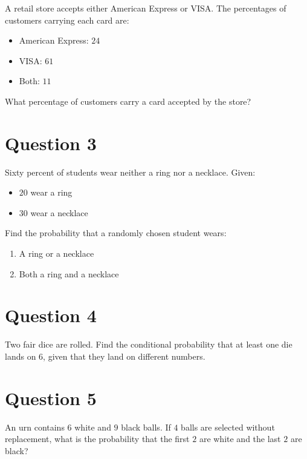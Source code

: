 \documentclass[
  letterpaper,
  DIV=11,
  numbers=noendperiod]{scrreprt}
\providecommand{\tightlist}{%
  \setlength{\itemsep}{0pt}\setlength{\parskip}{0pt}}\usepackage{longtable,booktabs,array}
\begin{document}
A retail store accepts either American Express or VISA. The percentages
of customers carrying each card are:

\begin{itemize}
\tightlist
\item
  American Express: \(24%
  \)
\item
  VISA: \(61%
  \)
\item
  Both: \(11%
  \)
\end{itemize}

What percentage of customers carry a card accepted by the store?

\section{Question 3}\label{question-3}

Sixty percent of students wear neither a ring nor a necklace. Given:

\begin{itemize}
\tightlist
\item
  \(20%
  \) wear a ring
\item
  \(30%
  \) wear a necklace
\end{itemize}

Find the probability that a randomly chosen student wears:

\begin{enumerate}
\def\labelenumi{\arabic{enumi}.}
\tightlist
\item
  A ring or a necklace
\item
  Both a ring and a necklace
\end{enumerate}

\section{Question 4}\label{question-4}

Two fair dice are rolled. Find the conditional probability that at least
one die lands on \(6\), given that they land on different numbers.

\section{Question 5}\label{question-5}

An urn contains \(6\) white and \(9\) black balls. If \(4\) balls are
selected without replacement, what is the probability that the first
\(2\) are white and the last \(2\) are black?
\end{document}
